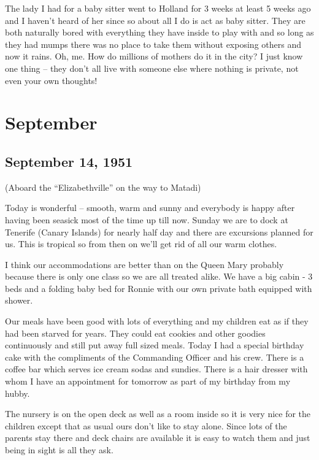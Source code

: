 \documentclass[
]{book}
\begin{document}
The lady I had for a baby sitter went to Holland for 3 weeks at least 5 weeks ago and I haven't heard of her since so about all I do is act as baby sitter. They are both naturally bored with everything they have inside to play with and so long as they had mumps there was no place to take them without exposing others and now it rains. Oh, me. How do millions of mothers do it in the city? I just know one thing -- they don't all live with someone else where nothing is private, not even your own thoughts!

\hypertarget{september-2}{%
\section{September}\label{september-2}}

\hypertarget{september-14-1951}{%
\subsection{September 14, 1951}\label{september-14-1951}}

(Aboard the ``Elizabethville'' on the way to Matadi)

Today is wonderful -- smooth, warm and sunny and everybody is happy after having been seasick most of the time up till now. Sunday we are to dock at Tenerife (Canary Islands) for nearly half day and there are excursions planned for us. This is tropical so from then on we'll get rid of all our warm clothes.

I think our accommodations are better than on the Queen Mary probably because there is only one class so we are all treated alike. We have a big cabin - 3 beds and a folding baby bed for Ronnie with our own private bath equipped with shower.

Our meals have been good with lots of everything and my children eat as if they had been starved for years. They could eat cookies and other goodies continuously and still put away full sized meals. Today I had a special birthday cake with the compliments of the Commanding Officer and his crew. There is a coffee bar which serves ice cream sodas and sundies. There is a hair dresser with whom I have an appointment for tomorrow as part of my birthday from my hubby.

The nursery is on the open deck as well as a room inside so it is very nice for the children except that as usual ours don't like to stay alone. Since lots of the parents stay there and deck chairs are available it is easy to watch them and just being in sight is all they ask.
\end{document}
